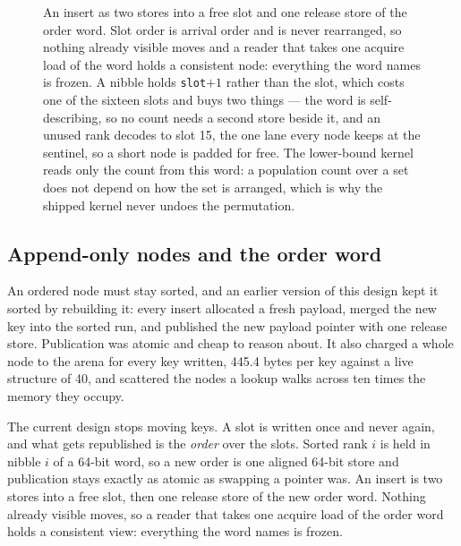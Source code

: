 \documentclass[conference]{IEEEtran}
\begin{document}
\begin{figure}[t]
{}
\caption{An insert as two stores into a free slot and one release store of the order word.
Slot order is arrival order and is never rearranged, so nothing already visible moves and a
reader that takes one acquire load of the word holds a consistent node: everything the word
names is frozen. A nibble holds \texttt{slot}$+1$ rather than the slot, which costs one of
the sixteen slots and buys two things --- the word is self-describing, so no count needs a
second store beside it, and an unused rank decodes to slot 15, the one lane every node keeps
at the sentinel, so a short node is padded for free. The lower-bound kernel reads only the
count from this word: a population count over a set does not depend on how the set is
arranged, which is why the shipped kernel never undoes the permutation.}
\label{fig:order}
\end{figure}

\subsection{Append-only nodes and the order word}
\label{sec:append}

An ordered node must stay sorted, and an earlier version of this design kept it
sorted by rebuilding it: every insert allocated a fresh payload, merged the new
key into the sorted run, and published the new payload pointer with one release
store. Publication was atomic and cheap to reason about. It also charged a whole
node to the arena for every key written, 445.4 bytes per key against a live
structure of 40, and scattered the nodes a lookup walks across ten times the
memory they occupy.

The current design stops moving keys. A slot is written once and never again, and
what gets republished is the \emph{order} over the slots. Sorted rank $i$ is held
in nibble $i$ of a 64-bit word, so a new order is one aligned 64-bit store and
publication stays exactly as atomic as swapping a pointer was. An insert is two
stores into a free slot, then one release store of the new order word. Nothing
already visible moves, so a reader that takes one acquire load of the order word
holds a consistent view: everything the word names is frozen.
\end{document}
